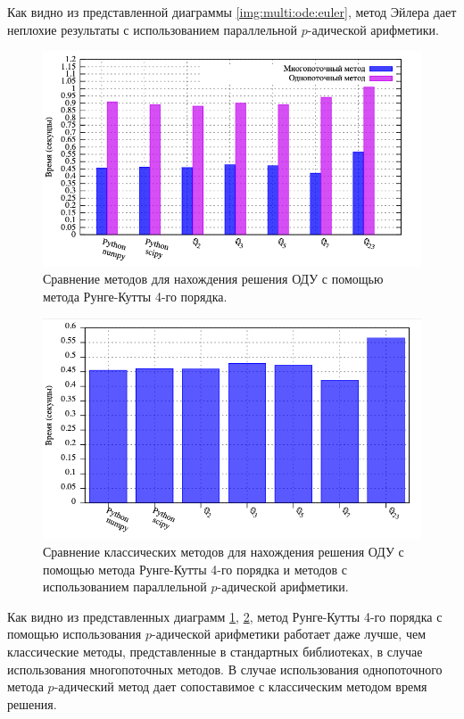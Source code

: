 \documentclass[master, och, diploma, times]{sty/SCWorks}
\theoremstyle{plain}
\theoremstyle{definition}
\numberwithin{equation}{section}
\begin{document}
Как видно из представленной диаграммы \ref{img:multi:ode:euler}, метод Эйлера дает неплохие результаты с использованием параллельной $p$-адической арифметики.


\begin{figure}[H]
\centerline{\includegraphics[width=0.85\linewidth]{../gnuplot/multi/rk/plot.png}}
\caption{Сравнение методов для нахождения решения ОДУ с помощью метода Рунге-Кутты 4-го порядка.}
\label{img:comp:ode:rk}
\end{figure}

\begin{figure}[H]
\centerline{\includegraphics[width=0.85\linewidth]{../gnuplot/multi/rk/multi.png}}
\caption{Сравнение классических методов для нахождения решения ОДУ с помощью метода Рунге-Кутты 4-го порядка и методов с использованием параллельной $p$-адической арифметики.}
\label{img:comp:ode:rk:multi}
\end{figure}

Как видно из представленных диаграмм \ref{img:comp:ode:rk}, \ref{img:comp:ode:rk:multi}, метод Рунге-Кутты 4-го порядка с помощью использования $p$-адической арифметики работает даже лучше, чем классические методы, представленные в стандартных библиотеках, в случае использования многопоточных методов. В случае использования однопоточного метода $p$-адический метод дает сопоставимое с классическим методом время решения.
\end{document}
